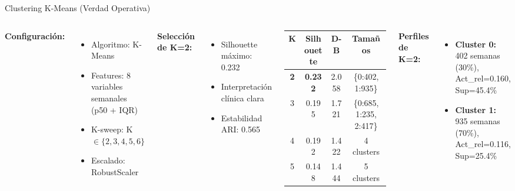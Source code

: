 \documentclass[aspectratio=169]{beamer}
\begin{document}
\begin{frame}{Clustering K-Means (Verdad Operativa)}

\begin{columns}[T]
\textbf{Configuración:}
\begin{itemize}
    \item Algoritmo: K-Means
    \item Features: 8 variables semanales (p50 + IQR)
    \item K-sweep: K $\in \{2,3,4,5,6\}$
    \item Escalado: RobustScaler
\end{itemize}

\vspace{0.3cm}

\textbf{Selección de K=2:}
\begin{itemize}
    \item Silhouette máximo: 0.232
    \item Interpretación clínica clara
    \item Estabilidad ARI: 0.565
\end{itemize}

\begin{table}
\centering
\small
\begin{tabular}{cccc}
\toprule
\textbf{K} & \textbf{Silhouette} & \textbf{D-B} & \textbf{Tamaños} \\
\midrule
\textbf{2} & \textbf{0.232} & 2.058 & \{0:402, 1:935\} \\
3 & 0.195 & 1.721 & \{0:685, 1:235, 2:417\} \\
4 & 0.192 & 1.422 & 4 clusters \\
5 & 0.148 & 1.444 & 5 clusters \\
\bottomrule
\end{tabular}
\end{table}

\vspace{0.3cm}

\textbf{Perfiles de K=2:}
\begin{itemize}
    \item \textbf{Cluster 0:} 402 semanas (30\%), Act\_rel=0.160, Sup=45.4\%
    \item \textbf{Cluster 1:} 935 semanas (70\%), Act\_rel=0.116, Sup=25.4\%
\end{itemize}
\end{columns}

\end{frame}
\end{document}
